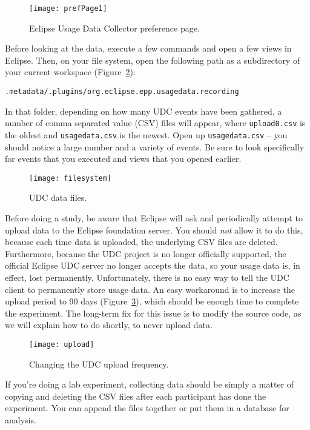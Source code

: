 \begin{figure}
  \centering
  \texttt{[image: prefPage1]}
  \caption{Eclipse Usage Data Collector preference page.}\label{fig:prefPage1}
\end{figure}

Before looking at the data, execute a few commands and open a few views 
in Eclipse.
Then, on your file system, open the following path as a subdirectory
of your current workspace (Figure~\ref{fig:filesystem}): 

\vspace{4mm}
\texttt{.metadata/.plugins/org.eclipse.epp.usagedata.recording}
\vspace{4mm}

\noindent
In that folder, depending on how many UDC events have been gathered,
a number of comma separated value (CSV) files will appear, where \texttt{upload0.csv} is the oldest
and \texttt{usagedata.csv} is the newest.
Open up \texttt{usagedata.csv} -- you should notice a large number and a variety of events.
Be sure to look specifically for events that you executed and views that you opened earlier.

\begin{figure}
  \centering
  \texttt{[image: filesystem]}
  \caption{UDC data files.}\label{fig:filesystem}
\end{figure}

Before doing a study, be aware that Eclipse will ask and periodically attempt to upload
data to the Eclipse foundation server.
You should \emph{not} allow it to do this, because each time data is uploaded, the underlying
CSV files are deleted.
Furthermore, because the UDC project is no longer officially supported, the official Eclipse
UDC server no longer accepts the data, so your usage data is, in effect, lost permanently.
Unfortunately, there is no easy way to tell the UDC client to permanently store
usage data.
An easy workaround is to increase the upload period to 90 days (Figure~\ref{fig:upload}),
which should be enough time to complete the experiment.
The long-term fix for this issue is to modify the source code, as we will explain
how to do shortly, to never upload data.

\begin{figure}
  \centering
  \texttt{[image: upload]}
  \caption{Changing the UDC upload frequency.}\label{fig:upload}
\end{figure}

If you're doing a lab experiment, collecting data should be simply a matter of 
copying and deleting the CSV files after each participant has done the experiment.
You can append the files together or put them in a database for analysis.

